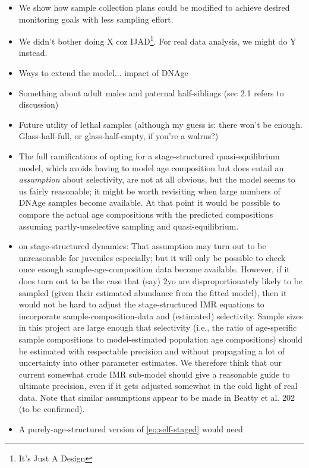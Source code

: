 %

\begin{itemize}
\item We show how sample collection plans could be modified to achieve desired
monitoring goals with less sampling effort.
\item We didn't bother doing X coz IJAD\footnote{It's Just A Design}. For
real data analysis, we might do Y instead.
\item Ways to extend the model... impact of DNAge
\item Something about adult males and paternal half-siblings (sec 2.1 refers
to discussion)
\item Future utility of lethal samples (although my guess is: there won't
be enough. Glass-half-full, or glass-half-empty, if you're a walrus?)
\item The full ramifications of opting for a stage-structured quasi-equilibrium
model, which avoids having to model age composition but does entail
an \emph{assumption} about selectivity, are not at all obvious, but
the model seems to us fairly reasonable; it might be worth revisiting
when large numbers of DNAge samples become available. At that point
it would be possible to compare the actual age compositions with the
predicted compositions assuming partly-unselective sampling and quasi-equilibrium.
\item on stage-structured dynamics: That assumption may turn out to be unreasonable
for juveniles especially; but it will only be possible to check once
enough sample-age-composition data become available. However, if it
does turn out to be the case that (say) 2yo are disproportionately
likely to be sampled (given their estimated abundance from the fitted
model), then it would not be hard to adjust the stage-structured IMR
equations to incorporate sample-composition-data and (estimated) selectivity.
Sample sizes in this project are large enough that selectivity (i.e.,
the ratio of age-specific sample compositions to model-estimated population
age compositions) should be estimated with respectable precision and
without \textquotedbl propagating\textquotedbl{} a lot of uncertainty
into other parameter estimates. We therefore think that our current
somewhat crude IMR sub-model should give a reasonable guide to ultimate
precision, even if it gets adjusted somewhat in the cold light of
real data. Note that similar assumptions appear to be made in Beatty
et al. 202 (to be confirmed).
%
\item A purely-age-structured version of \eqref{eq:self-staged} would need

\end{itemize}
